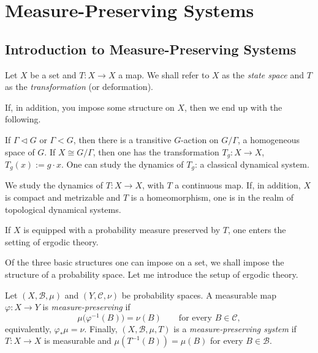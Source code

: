 \documentclass[11pt,a4paper]{article}
\begin{document}
\section*{Measure-Preserving Systems}
\subsection{Introduction to Measure-Preserving Systems}
Let $X$ be a set and $T\colon X\to X$ a map. We shall refer to $X$ as the
\emph{state space} and $T$ as the \emph{transformation} (or deformation).

If, in addition, you impose some structure on $X$, then we end up with the
following.
\begin{description}[style=nextline,leftmargin=1.5em,labelindent=0pt]
  \item[Group structure.]
  If $\Gamma\triangleleft G$ or $\Gamma<G$, then there is a transitive
  $G$-action on $G/\Gamma$, a homogeneous space of $G$. If $X\cong G/\Gamma$,
  then one has the transformation $T_g\colon X\to X$, $T_g(x):=g\cdot x$.
  One can study the dynamics of $T_g$: a classical dynamical system.
  \item[Topological structure.]
  We study the dynamics of $T\colon X\to X$, with $T$ a continuous map. If,
  in addition, $X$ is compact and metrizable and $T$ is a homeomorphism, one
  is in the realm of topological dynamical systems.
  \item[Measure structure.]
  If $X$ is equipped with a probability measure preserved by $T$, one enters
  the setting of ergodic theory.
\end{description}
Of the three basic structures one can impose on a set, we shall impose the
structure of a probability space. Let me introduce the setup of ergodic
theory.

\setcounter{definition}{2}\begin{definition}
Let $(X,\mathcal B,\mu)$ and $(Y,\mathcal C,\nu)$ be probability spaces. A
measurable map $\varphi\colon X\to Y$ is \emph{measure-preserving} if
\[
  \mu\bigl(\varphi^{-1}(B)\bigr)=\nu(B)
  \qquad\text{for every }B\in\mathcal C,
\]
equivalently, $\varphi_*\mu=\nu$. Finally,
$(X,\mathcal B,\mu,T)$ is a \emph{measure-preserving system} if
$T\colon X\to X$ is measurable and
$\mu(T^{-1}(B))=\mu(B)$ for every $B\in\mathcal B$.
\end{definition}
\end{document}
